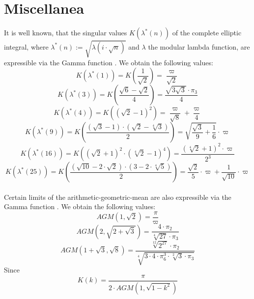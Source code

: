 \documentclass[sn-mathphys]{sn-jnl}%
\theoremstyle{thmstyleone}%
\theoremstyle{thmstyletwo}%
\theoremstyle{thmstylethree}%
\begin{document}
\section{Miscellanea}\label{sec5}
It is well known, that the singular values $K(\lambda^*(n))$ of the complete elliptic integral, where $\lambda^*(n) := \sqrt{\lambda(i \cdot \sqrt{n})}$ and $\lambda$ the modular lambda function, are expressible via the Gamma function \cite{wolfram}.
We obtain the following values:
\begin{equation}
K(\lambda^*(1)) = K(\frac{1}{\sqrt{2}}) = \frac{\varpi}{\sqrt{2}}
\end{equation}
\begin{equation}
K(\lambda^*(3)) = K(\frac{\sqrt{6} - \sqrt{2}}{4}) = \frac{\sqrt{3 \sqrt{3}} \cdot \pi_3}{4}
\end{equation}
\begin{equation}
K(\lambda^*(4)) = K((\sqrt{2} - 1)^2) = \frac{\varpi}{\sqrt{8}} + \frac{\varpi}{4}
\end{equation}
\begin{equation}
K(\lambda^*(9)) = K(\frac{(\sqrt{3}-1) \cdot (\sqrt{2} - \sqrt[4]{3})}{2}) = \sqrt{\frac{\sqrt{3}}{9} + \frac{1}{6}} \cdot \varpi
\end{equation}
\begin{equation}
K(\lambda^*(16)) = K((\sqrt{2} + 1)^2 \cdot (\sqrt[4]{2}-1)^4) = \frac{(\sqrt[4]{2} + 1)^2 \cdot \varpi}{2^3}
\end{equation}
\begin{equation}
K(\lambda^*(25)) = K(\frac{(\sqrt{10} - 2 \cdot \sqrt{2}) \cdot (3 - 2 \cdot \sqrt[4]{5})}{2}) = \frac{\sqrt{2}}{5} \cdot \varpi + \frac{1}{\sqrt{10}} \cdot \varpi
\end{equation} 
\\
Certain limits of the arithmetic-geometric-mean are also expressible via the Gamma function \cite{wikipedia}. We obtain the following values:
\begin{equation}
AGM(1,\sqrt{2}) = \frac{\pi}{\varpi}
\end{equation}
\begin{equation}
AGM(2, \sqrt{2 + \sqrt{3}}) = \frac{4 \cdot \pi_2}{\sqrt[4]{27} \cdot \pi_3}
\end{equation}
\begin{equation}
AGM(1+\sqrt{3}, \sqrt{8}) = \frac{\sqrt[12]{2^{27}} \cdot \pi_2}{\sqrt[4]{3 \cdot 4 \cdot \pi_{6}^{3} \cdot \sqrt[2]{3} \cdot \pi_3}}
\end{equation}
Since 
\begin{equation*}
K(k) = \frac{\pi}{2 \cdot AGM(1, \sqrt{1-k^2})}
\end{equation*}
\end{document}
